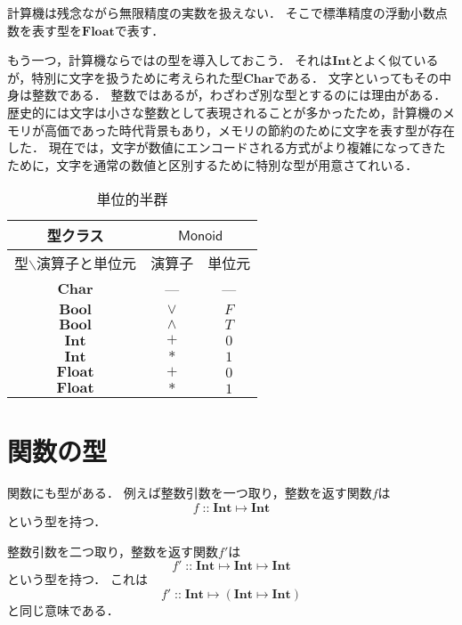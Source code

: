 \documentclass[twocolumn]{jsbook}
\newcommand{\hsklType}[1]{\textbf{#1}}
\newcommand{\hsklTypeclass}[1]{\mathsf{#1}}
\newcommand{\hsklBool}{\hsklType{Bool}}
\newcommand{\hsklChar}{\hsklType{Char}}
\newcommand{\hsklInt}{\hsklType{Int}}
\newcommand{\hsklFloat}{\hsklType{Float}}
\newcommand{\hsklMonoid}{\hsklTypeclass{Monoid}}
\DeclareMathOperator{\mathIn}{::}
\DeclareMathOperator{\mathMapsTo}{\mapsto}
\newcommand{\mathMorph}[2]{#1\mathMapsTo#2}
\newcommand{\mathMorphII}[3]{#1\mathMapsTo#2\mathMapsTo#3}
\newcommand{\mathMorphIIWithParenthesis}[3]{#1\mathMapsTo(#2\mathMapsTo#3)}
\newcommand{\typename}[1]{\mathbf{#1}}
\newcommand{\typechar}{\typename{Char}}
\begin{document}
計算機は残念ながら無限精度の実数を扱えない．
そこで標準精度の浮動小数点数を表す型を$\hsklFloat$で表す．

もう一つ，計算機ならではの型を導入しておこう．
それは$\hsklInt$とよく似ているが，特別に文字を扱うために考えられた型$\hsklChar$である．
文字といってもその中身は整数である．
整数ではあるが，わざわざ別な型とするのには理由がある．
歴史的には文字は小さな整数として表現されることが多かったため，計算機のメモリが高価であった時代背景もあり，メモリの節約のために文字を表す型が存在した．
現在では，文字が数値にエンコードされる方式がより複雑になってきたために，文字を通常の数値と区別するために特別な型が用意さてれいる．

\begin{table}
\caption{単位的半群}
\label{tab:monoids}
\begin{center}
\begin{tabular}{||c||c|c||}
\hline
型クラス
    &\multicolumn{2}{|c||}{$\hsklMonoid$}\\
\hline\hline
型$\backslash$演算子と単位元
    &演算子
    &単位元\\
\hline
$\typechar$
    &---
    &---\\
\hline
$\hsklBool$
    &$\vee$
    &$F$\\
\hline
$\hsklBool$
    &$\wedge$
    &$T$\\
\hline
$\hsklInt$
    &$+$
    &$0$\\
\hline
$\hsklInt$
    &$*$
    &$1$\\
\hline
$\hsklFloat$
    &$+$
    &$0$\\
\hline
$\hsklFloat$
    &$*$
    &$1$\\
\hline
\end{tabular}
\end{center}
\end{table}

\section{関数の型}

関数にも型がある．
例えば整数引数を一つ取り，整数を返す関数$f$は$$f\mathIn\mathMorph{\hsklInt}{\hsklInt}$$という型を持つ．

整数引数を二つ取り，整数を返す関数$f'$は$$f'\mathIn\mathMorphII{\hsklInt}{\hsklInt}{\hsklInt}$$という型を持つ．
これは$$f'\mathIn\mathMorphIIWithParenthesis{\hsklInt}{\hsklInt}{\hsklInt}$$と同じ意味である．
\end{document}
